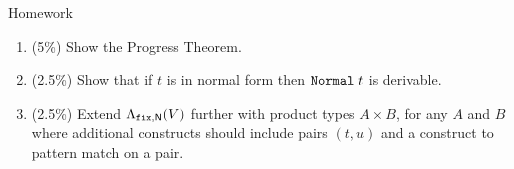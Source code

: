 %

\begin{frame}{Homework}
  \begin{enumerate}
    \item (5\%) Show the Progress Theorem.
    \item (2.5\%) Show that if $t$ is in normal form then $\mathtt{Normal}\;t$ is derivable.
    \item (2.5\%) Extend $\Lambda_{\mathtt{fix}, \mathsf{N}}(V)$ further with product types $A \times B$, for any $A$ and $B$ where additional constructs should include pairs $(t, u)$ and a construct to pattern match on a pair.

  \end{enumerate}
  
\end{frame}

%
%
% 
%

\appendix



